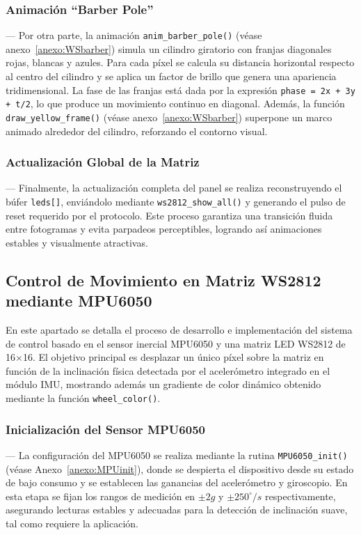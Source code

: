 \vspace{1em}

\subsubsection{Animación ``Barber Pole''} ---
Por otra parte, la animación \texttt{anim\_barber\_pole()} (véase anexo~\ref{anexo:WSbarber}) simula un cilindro giratorio con franjas diagonales rojas, blancas y azules. Para cada píxel se calcula su distancia horizontal respecto al centro del cilindro y se aplica un factor de brillo que genera una apariencia tridimensional. La fase de las franjas está dada por la expresión \texttt{phase = 2x + 3y + t/2}, lo que produce un movimiento continuo en diagonal. Además, la función \texttt{draw\_yellow\_frame()} (véase anexo~\ref{anexo:WSbarber}) superpone un marco animado alrededor del cilindro, reforzando el contorno visual.

\vspace{1em}

\subsubsection{Actualización Global de la Matriz} ---
Finalmente, la actualización completa del panel se realiza reconstruyendo el búfer \texttt{leds[]}, enviándolo mediante \texttt{ws2812\_show\_all()} y generando el pulso de reset requerido por el protocolo. Este proceso garantiza una transición fluida entre fotogramas y evita parpadeos perceptibles, logrando así animaciones estables y visualmente atractivas.




\subsection{Control de Movimiento en Matriz WS2812 mediante MPU6050}

En este apartado se detalla el proceso de desarrollo e implementación del sistema de control basado en el sensor inercial MPU6050 y una matriz LED WS2812 de 16$\times$16. El objetivo principal es desplazar un único píxel sobre la matriz en función de la inclinación física detectada por el acelerómetro integrado en el módulo IMU, mostrando además un gradiente de color dinámico obtenido mediante la función \texttt{wheel\_color()}.

\vspace{1em}

\subsubsection{Inicialización del Sensor MPU6050} ---
La configuración del MPU6050 se realiza mediante la rutina \texttt{MPU6050\_init()} (véase Anexo~\ref{anexo:MPUinit}), donde se despierta el dispositivo desde su estado de bajo consumo y se establecen las ganancias del acelerómetro y giroscopio. En esta etapa se fijan los rangos de medición en $\pm 2g$ y $\pm 250^{\circ}/s$ respectivamente, asegurando lecturas estables y adecuadas para la detección de inclinación suave, tal como requiere la aplicación.

